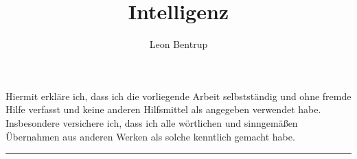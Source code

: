 \documentclass[12pt, a4paper]{scrreprt}
\title{Intelligenz}
\author{Leon Bentrup}
\begin{document}
  \maketitle
  \tableofcontents

  
  
  
  
  
  

  
  

  \newpage

  Hiermit erkläre ich, dass ich die vorliegende Arbeit selbstständig und ohne fremde Hilfe
  verfasst und keine anderen Hilfsmittel als angegeben verwendet habe. Insbesondere
  versichere ich, dass ich alle wörtlichen und sinngemäßen Übernahmen aus anderen Werken
  als solche kenntlich gemacht habe.
  \vspace{3cm}
  \hrule
\end{document}
